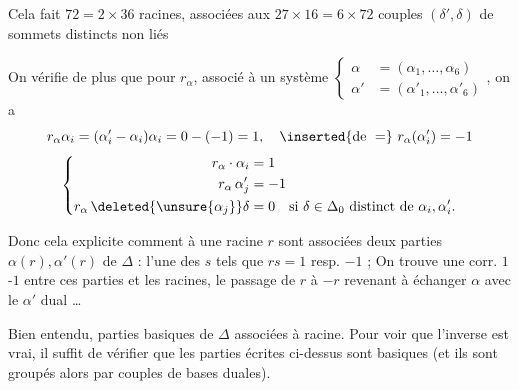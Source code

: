 Cela fait $72=2\times36$ racines, associées aux $27\times16=6\times72$
 couples $(\delta',\delta)$ de sommets distincts non liés

On vérifie de plus que pour   $r_\alpha$, associé à un système
$\left\{\begin{aligned}\alpha&=(\alpha_1,\ldots,\alpha_6)\\\alpha'&=(\alpha'_1,\ldots,\alpha'_6)\end{aligned}\right.$, on a
\[
r_\alpha\alpha_i=(\alpha'_i-\alpha_i)\alpha_i=0-(-1)=1,\quad
\inserted{\text{de }=}\ r_\alpha(\alpha'_i)=-1
\]
\[
\left\{\begin{aligned}
r_\alpha\cdot\alpha_i&=1\\
r_\alpha\,\alpha'_j&=-1\\
r_\alpha\,\deleted{\unsure{\alpha_j}}\delta&=0\quad\text{si }\delta\in\Delta_0\text{ distinct de }\alpha_i,\alpha'_i .
\end{aligned}\right.
\]

Donc cela explicite  comment à une racine $r$ sont associées deux parties $\alpha(r),\alpha'(r)$ de $\Delta$ : l'une des $s$ \inserted{$\in\Delta$} tels que $rs=1$ resp. $-1$ ; On trouve une corr. $1$-$1$ entre ces parties \inserted{$\alpha$} et les  racines, le passage de $r$ à $-r$ revenant à échanger $\alpha$ avec le $\alpha'$ dual \ldots

Bien entendu,   parties basiques de $\Delta$  associées à   racine. Pour voir que l'inverse est vrai, il suffit de vérifier que les parties écrites ci-dessus  sont basiques (et ils sont groupés alors par couples de bases duales).

